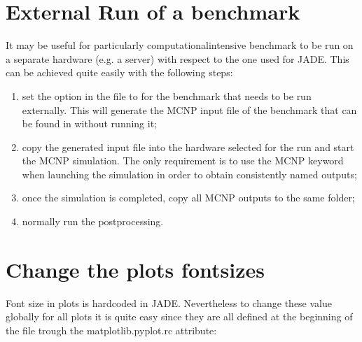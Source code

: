 \documentclass[letterpaper,10pt,english]{sphinxmanual}
\begin{document}
\section{External Run of a benchmark}
\label{\detokenize{usage/tipstricks:external-run-of-a-benchmark}}\label{\detokenize{usage/tipstricks:externalrun}}
It may be useful for particularly computational\sphinxhyphen{}intensive benchmark to be
run on a separate hardware (e.g. a server) with respect to the one used for JADE.
This can be achieved quite easily with the following steps:
\begin{enumerate}
%
\item {} 
set the  option in the 
file to  for the benchmark that needs to be run externally. This
will generate the MCNP input file of the benchmark that can be found in
without running it;

\item {} 
copy the generated input file into the hardware selected for the run and start the
MCNP simulation. The only requirement is to use the MCNP keyword  
when launching the simulation in order to obtain consistently named outputs;

\item {} 
once the simulation is completed, copy all MCNP outputs to the same
 folder;

\item {} 
normally run the post\sphinxhyphen{}processing.

\end{enumerate}


\section{Change the plots fontsizes}
\label{\detokenize{usage/tipstricks:change-the-plots-fontsizes}}
Font size in plots is hardcoded in JADE. Nevertheless to change these value globally
for all plots it is quite easy since they are all defined at the beginning of the
 file trough the matplotlib.pyplot.rc attribute:
\end{document}
